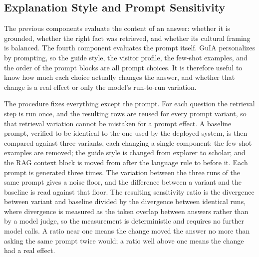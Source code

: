 
\subsection{Explanation Style and Prompt Sensitivity}

The previous components evaluate the content of an answer: whether it is grounded, whether the right fact was retrieved, and whether its cultural framing is balanced. The fourth component evaluates the prompt itself. GuIA personalizes by prompting, so the guide style, the visitor profile, the few-shot examples, and the order of the prompt blocks are all prompt choices. It is therefore useful to know how much each choice actually changes the answer, and whether that change is a real effect or only the model's run-to-run variation.

The procedure fixes everything except the prompt. For each question the retrieval step is run once, and the resulting rows are reused for every prompt variant, so that retrieval variation cannot be mistaken for a prompt effect. A baseline prompt, verified to be identical to the one used by the deployed system, is then compared against three variants, each changing a single component: the few-shot examples are removed; the guide style is changed from explorer to scholar; and the RAG context block is moved from after the language rule to before it. Each prompt is generated three times. The variation between the three runs of the same prompt gives a noise floor, and the difference between a variant and the baseline is read against that floor. The resulting sensitivity ratio is the divergence between variant and baseline divided by the divergence between identical runs, where divergence is measured as the token overlap between answers rather than by a model judge, so the measurement is deterministic and requires no further model calls. A ratio near one means the change moved the answer no more than asking the same prompt twice would; a ratio well above one means the change had a real effect.


